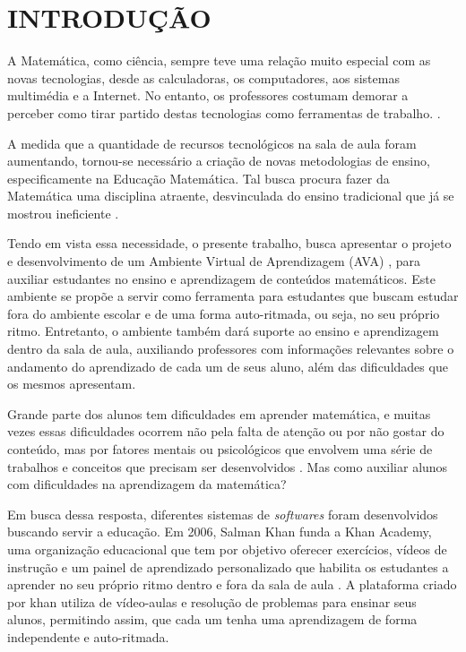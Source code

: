 \section{INTRODUÇÃO}

A Matemática, como ciência, sempre teve uma relação muito especial com as novas tecnologias, desde as calculadoras, os computadores, aos sistemas multimédia e a Internet. No entanto, os professores costumam demorar a perceber como tirar partido destas tecnologias como ferramentas de trabalho. \cite{da1997ensino}. 

A medida que a quantidade de recursos tecnológicos na sala de aula foram aumentando, tornou-se necessário a criação de novas metodologias de ensino, especificamente na Educação Matemática. Tal busca procura fazer da Matemática uma disciplina atraente, desvinculada do ensino tradicional que já se mostrou ineficiente \cite{silva2009ambiente}.

Tendo em vista essa necessidade, o presente trabalho, busca apresentar o projeto e desenvolvimento de um Ambiente Virtual de Aprendizagem (AVA) \cite{valentini2010aprendizagem}, para auxiliar estudantes no ensino e aprendizagem de conteúdos matemáticos. Este ambiente se propõe a servir como ferramenta para estudantes que buscam estudar fora do ambiente escolar e de uma forma auto-ritmada, ou seja, no seu próprio ritmo. Entretanto, o ambiente também dará suporte ao ensino e aprendizagem dentro da sala de aula, auxiliando professores com informações relevantes sobre o andamento do aprendizado de cada um de seus aluno, além das dificuldades que os mesmos apresentam.

Grande parte dos alunos tem dificuldades em aprender matemática, e muitas vezes essas dificuldades ocorrem não pela falta de atenção ou por não gostar do conteúdo, mas por fatores mentais ou psicológicos que envolvem uma série de trabalhos
e conceitos que precisam ser desenvolvidos \cite{sa2015software}. Mas como auxiliar alunos com dificuldades na aprendizagem da matemática?

Em busca dessa resposta, diferentes sistemas de \textit{softwares} foram desenvolvidos buscando servir a educação. Em 2006, Salman Khan funda a Khan Academy, uma organização educacional que tem por objetivo oferecer exercícios, vídeos de instrução e um painel de aprendizado personalizado que habilita os estudantes a aprender no seu próprio ritmo dentro e fora da sala de aula \cite{khan2012one}. A plataforma criado por khan utiliza de vídeo-aulas e resolução de problemas para ensinar seus alunos, permitindo assim, que cada um tenha uma aprendizagem de forma independente e auto-ritmada.

